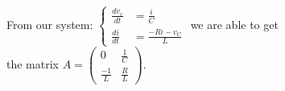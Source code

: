 \documentclass[preview]{standalone}
\begin{document}
\begin{center}
\raggedright
                    From our system: 
                    \(\left\{
                    \begin{aligned}
                        \frac{dv_c}{dt} &= \frac{i}{C} \\
                        \frac{di}{dt} &= \frac{-Ri - v_C}{L}
                    \end{aligned}
                    \right.\) we are able to get \\[5pt]
                    the matrix \(A = \begin{pmatrix}
                                0 & \frac{1}{C} \\
                                \frac{-1}{L} & \frac{R}{L}
                            \end{pmatrix}\).
\end{center}
\end{document}
